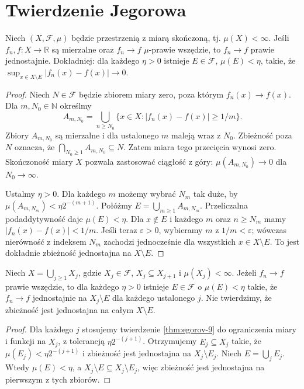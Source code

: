 \section{Twierdzenie Jegorowa}

\begin{twierdzenie}[Jegorow]
\label{thm:egorov-9}
Niech $(X,\mathcal F,\mu)$ będzie przestrzenią z miarą
skończoną, tj. $\mu(X)<\infty$. Jeśli
$f_n,f:X\to\mathbb R$ są mierzalne oraz
$f_n\to f$ $\mu$-prawie wszędzie, to
$f_n\to f$ prawie jednostajnie. Dokładniej: dla każdego
$\eta>0$ istnieje $E\in\mathcal F$, $\mu(E)<\eta$,
takie, że
$\sup_{x\in X\setminus E}|f_n(x)-f(x)|\to0$.
\end{twierdzenie}
\begin{proof}
Niech $N\in\mathcal F$ będzie zbiorem miary zero,
poza którym $f_n(x)\to f(x)$. Dla $m,N_0\in\mathbb N$
określmy
\[
A_{m,N_0}=\bigcup_{n\ge N_0}
\{x\in X:|f_n(x)-f(x)|\ge1/m\}.
\]
Zbiory $A_{m,N_0}$ są mierzalne i dla ustalonego $m$
maleją wraz z $N_0$. Zbieżność poza $N$ oznacza,
że $\bigcap_{N_0\ge1}A_{m,N_0}\subseteq N$.
Zatem miara tego przecięcia wynosi zero. Skończoność
miary $X$ pozwala zastosować ciągłość z góry:
$\mu(A_{m,N_0})\to0$ dla $N_0\to\infty$.

Ustalmy $\eta>0$. Dla każdego $m$ możemy wybrać
$N_m$ tak duże, by
$\mu(A_{m,N_m})<\eta 2^{-(m+1)}$.
Połóżmy $E=\bigcup_{m\ge1}A_{m,N_m}$.
Przeliczalna podaddytywność daje
$\mu(E)<\eta$.
Dla $x\notin E$ i każdego $m$ oraz $n\ge N_m$
mamy $|f_n(x)-f(x)|<1/m$. Jeśli teraz
$\varepsilon>0$, wybieramy $m$ z $1/m<\varepsilon$;
wówczas nierówność z indeksem $N_m$ zachodzi
jednocześnie dla wszystkich $x\in X\setminus E$.
To jest dokładnie zbieżność jednostajna na
$X\setminus E$.
\end{proof}

\begin{wniosek}
\label{cor:local-egorov-9}
Niech $X=\bigcup_{j\ge1}X_j$, gdzie $X_j\in\mathcal F$,
$X_j\subseteq X_{j+1}$ i $\mu(X_j)<\infty$.
Jeżeli $f_n\to f$ prawie wszędzie, to dla każdego
$\eta>0$ istnieje $E\in\mathcal F$ o $\mu(E)<\eta$
takie, że $f_n\to f$ jednostajnie na
$X_j\setminus E$ dla każdego ustalonego $j$.
Nie twierdzimy, że zbieżność jest jednostajna
na całym $X\setminus E$.
\end{wniosek}
\begin{proof}
Dla każdego $j$ stosujemy twierdzenie
\ref{thm:egorov-9} do ograniczenia miary i funkcji
na $X_j$, z tolerancją $\eta 2^{-(j+1)}$.
Otrzymujemy $E_j\subseteq X_j$ takie, że
$\mu(E_j)<\eta 2^{-(j+1)}$ i zbieżność jest
jednostajna na $X_j\setminus E_j$.
Niech $E=\bigcup_jE_j$. Wtedy $\mu(E)<\eta$, a
$X_j\setminus E\subseteq X_j\setminus E_j$,
więc zbieżność jest jednostajna na pierwszym z tych
zbiorów.
\end{proof}

